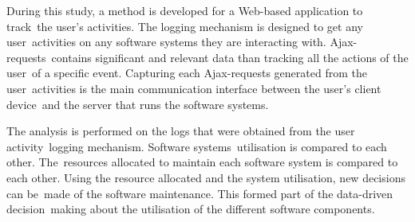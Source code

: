 During this study, a method is developed for a Web-based application to
track the user’s activities. The logging mechanism is designed to get any
user activities on any software systems they are interacting with.
Ajax-requests contains significant and relevant data than tracking all the
actions of the user of a specific event. Capturing each Ajax-requests generated
from the user activities is the main communication interface between the user’s
client device and the server that runs the software systems.

The analysis is performed on the logs that were obtained from the user
activity logging mechanism. Software systems utilisation is compared to each
other. The resources allocated to maintain each software system is compared to
each other. Using the resource allocated and the system utilisation, new
decisions can be made of the software maintenance. This formed part of the
data-driven decision making about the utilisation of the different software
components.
